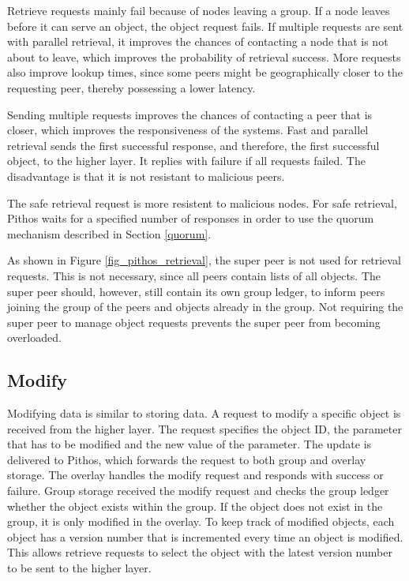 Retrieve requests mainly fail because of nodes leaving a group. If a node leaves before it can serve an object, the object request fails. If multiple requests are sent with parallel retrieval, it improves the chances of contacting a node that is not about to leave, which improves the probability of retrieval success. More requests also improve lookup times, since some peers might be geographically closer to the requesting peer, thereby possessing a lower latency.

Sending multiple requests improves the chances of contacting a peer that is closer, which improves the responsiveness of the systems. Fast and parallel retrieval sends the first successful  response, and therefore, the first successful object, to the higher layer. It replies with failure if all requests failed. The disadvantage is that it is not resistant to malicious peers.

The safe retrieval request is more resistent to malicious nodes. For safe retrieval, Pithos waits for a specified number of responses in order to use the quorum mechanism described in Section \ref{quorum}.

As shown in Figure \ref{fig_pithos_retrieval}, the super peer is not used for retrieval requests. This is not necessary, since all peers contain lists of all objects. The super peer should, however, still contain its own group ledger, to inform peers joining the group of the peers and objects already in the group. Not requiring the super peer to manage object requests prevents the super peer from becoming overloaded.

\subsection{Modify}

Modifying data is similar to storing data. A request to modify a specific object is received from the higher layer. The request specifies the object ID, the parameter that has to be modified and the new value of the parameter. The update is delivered to Pithos, which forwards the request to both group and overlay storage. The overlay handles the modify request and responds with success or failure. Group storage received the modify request and checks the group ledger whether the object exists within the group. If the object does not exist in the group, it is only modified in the overlay. To keep track of modified objects, each object has a version number that is incremented every time an object is modified. This allows retrieve requests to select the object with the latest version number to be sent to the higher layer.

